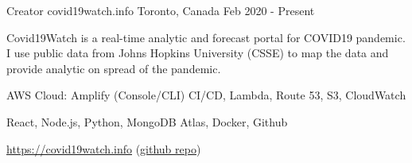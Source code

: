 \begin{cventries}
  \cventry
    {Creator}
    {covid19watch.info}
    {Toronto, Canada}
    {Feb 2020 - Present}
    {
      \begin{cvitems}
      \item {Covid19Watch is a real-time analytic and forecast portal for COVID19 pandemic. I use public data from Johns Hopkins University (CSSE) to map the data and provide analytic on spread of the pandemic.  }
      \item {AWS Cloud: Amplify (Console/CLI) CI/CD, Lambda, Route 53, S3, CloudWatch }
      \item {React, Node.js, Python, MongoDB Atlas, Docker, Github }
      \item {\url{https://covid19watch.info} (\href{https://github.com/sadrayan/covid19}{github repo})}
      \end{cvitems}
    }
\end{cventries}